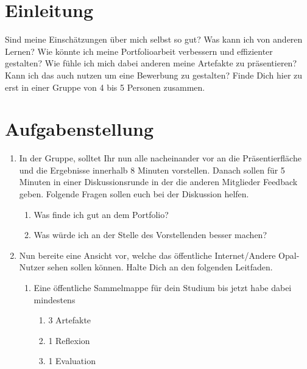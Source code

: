 \documentclass[a4paper,oneside]{scrarticle}
\begin{document}
	\section*{Einleitung}
	Sind meine Einschätzungen über mich selbst so gut? Was kann ich von anderen Lernen? Wie könnte ich meine Portfolioarbeit verbessern und effizienter gestalten? Wie fühle ich mich dabei anderen meine Artefakte zu präsentieren? Kann ich das auch nutzen um eine Bewerbung zu gestalten? Finde Dich hier zu erst in einer Gruppe von 4 bis 5 Personen zusammen.
	
	\section*{Aufgabenstellung}

	\begin{enumerate}
		\item In der Gruppe, solltet Ihr nun alle nacheinander vor an die Präsentierfläche und die Ergebnisse innerhalb 8 Minuten vorstellen. Danach sollen für 5 Minuten in einer Diskussionsrunde in der die anderen Mitglieder Feedback geben. Folgende Fragen sollen euch bei der Diskussion helfen. 
		\begin{enumerate}
			\item Was finde ich gut an dem Portfolio?
			\item Was würde ich an der Stelle des Vorstellenden besser machen?
		\end{enumerate}
		\item Nun bereite eine Ansicht vor, welche das öffentliche Internet/Andere Opal-Nutzer sehen sollen können. Halte Dich an den folgenden Leitfaden.
		\begin{enumerate}
			\item Eine öffentliche Sammelmappe für dein Studium bis jetzt habe dabei mindestens
			\begin{enumerate}
				\item 3 Artefakte
				\item 1 Reflexion
				\item 1 Evaluation
			\end{enumerate}
		\end{enumerate}

	\end{enumerate}
\end{document}
